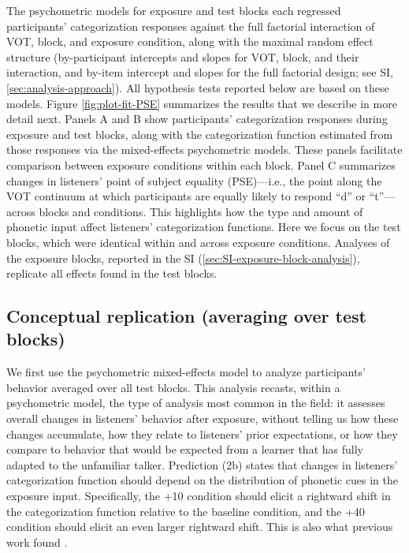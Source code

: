 \documentclass[
  11pt,
  man,mask,floatsintext]{apa6}
\begin{document}
The psychometric models for exposure and test blocks each regressed participants' categorization responses against the full factorial interaction of VOT, block, and exposure condition, along with the maximal random effect structure (by-participant intercepts and slopes for VOT, block, and their interaction, and by-item intercept and slopes for the full factorial design; see SI, \ref{sec:analysis-approach}). All hypothesis tests reported below are based on these models. Figure \ref{fig:plot-fit-PSE} summarizes the results that we describe in more detail next. Panels A and B show participants' categorization responses during exposure and test blocks, along with the categorization function estimated from those responses via the mixed-effects psychometric models. These panels facilitate comparison between exposure conditions within each block. Panel C summarizes changes in listeners' point of subject equality (PSE)---i.e., the point along the VOT continuum at which participants are equally likely to respond ``d'' or ``t''---across blocks and conditions. This highlights how the type and amount of phonetic input affect listeners' categorization functions. Here we focus on the test blocks, which were identical within and across exposure conditions. Analyses of the exposure blocks, reported in the SI (\ref{sec:SI-exposure-block-analysis}), replicate all effects found in the test blocks.

\subsection{Conceptual replication (averaging over test blocks)}\label{conceptual-replication-averaging-over-test-blocks}

We first use the psychometric mixed-effects model to analyze participants' behavior averaged over all test blocks. This analysis recasts, within a psychometric model, the type of analysis most common in the field: it assesses overall changes in listeners' behavior after exposure, without telling us how these changes accumulate, how they relate to listeners' prior expectations, or how they compare to behavior that would be expected from a learner that has fully adapted to the unfamiliar talker. Prediction (2b) states that changes in listeners' categorization function should depend on the distribution of phonetic cues in the exposure input. Specifically, the +10 condition should elicit a rightward shift in the categorization function relative to the baseline condition, and the +40 condition should elicit an even larger rightward shift. This is also what previous work found \autocite{kleinschmidt-jaeger2016}.
\end{document}
